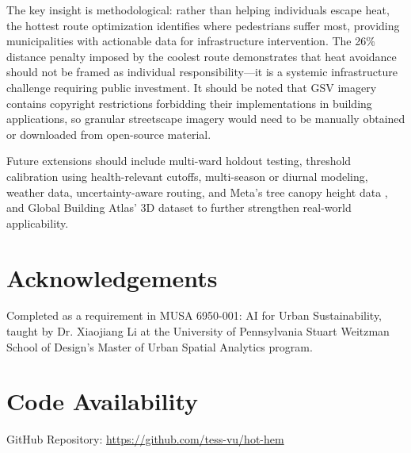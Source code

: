 \documentclass[
]{article}
\begin{document}
The key insight is methodological: rather than helping individuals escape heat, the hottest route optimization identifies where pedestrians suffer most, providing municipalities with actionable data for infrastructure intervention. The 26\% distance penalty imposed by the coolest route demonstrates that heat avoidance should not be framed as individual responsibility---it is a systemic infrastructure challenge requiring public investment. It should be noted that GSV imagery contains copyright restrictions forbidding their implementations in building applications, so granular streetscape imagery would need to be manually obtained or downloaded from open-source material.

Future extensions should include multi-ward holdout testing, threshold calibration using health-relevant cutoffs, multi-season or diurnal modeling, weather data, uncertainty-aware routing, and Meta’s tree canopy height data \citep{tolan2023}, and Global Building Atlas’ 3D dataset \citep{zhu2025} to further strengthen real-world applicability.

\section*{Acknowledgements}

Completed as a requirement in MUSA 6950-001: AI for Urban Sustainability, taught by Dr. Xiaojiang Li at the University of Pennsylvania Stuart Weitzman School of Design's Master of Urban Spatial Analytics program.

\section*{Code Availability}

GitHub Repository: \url{https://github.com/tess-vu/hot-hem}


\end{document}
